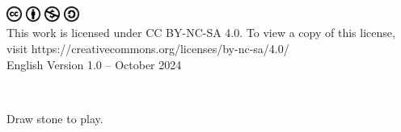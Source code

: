 \documentclass[a4paper,12pt]{extarticle}
\begin{document}
{\begin{center}
\includegraphics[width=0.5cm]{imgs/cc-logo.pdf}
\includegraphics[width=0.5cm]{imgs/cc-by.pdf}
\includegraphics[width=0.5cm]{imgs/cc-nc.pdf}
\includegraphics[width=0.5cm]{imgs/cc-sa.pdf}\\
{\normalsize{This work is licensed under CC BY-NC-SA 4.0. To view a copy of this license, visit https://creativecommons.org/licenses/by-nc-sa/4.0/}\\
  English Version 1.0 -- October 2024}
\end{center}

\newpage
\thispagestyle{empty}
\
\newpage
\begin{center}
  Draw stone to play.

  \vspace{2cm}

  \cleargoban  
  \largegoban
  \showgoban[a1,i9]

\end{center}

}
\end{document}
